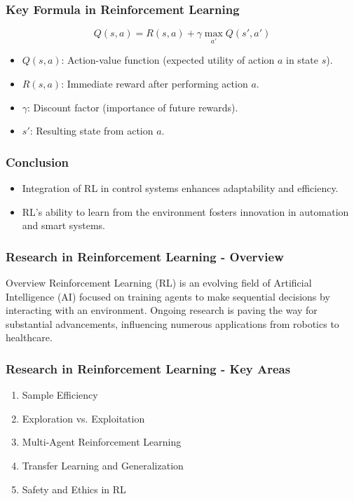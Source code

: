 \documentclass[aspectratio=169]{beamer}
\begin{document}
\begin{frame}[fragile]
    \frametitle{Key Formula in Reinforcement Learning}
    \begin{equation}
        Q(s, a) = R(s, a) + \gamma \max_{a'} Q(s', a')
    \end{equation}
    \begin{itemize}
        \item \( Q(s, a) \): Action-value function (expected utility of action \( a \) in state \( s \)).
        \item \( R(s, a) \): Immediate reward after performing action \( a \).
        \item \( \gamma \): Discount factor (importance of future rewards).
        \item \( s' \): Resulting state from action \( a \).
    \end{itemize}
\end{frame}

\begin{frame}[fragile]
    \frametitle{Conclusion}
    \begin{itemize}
        \item Integration of RL in control systems enhances adaptability and efficiency.
        \item RL's ability to learn from the environment fosters innovation in automation and smart systems.
    \end{itemize}
\end{frame}

\begin{frame}[fragile]
    \frametitle{Research in Reinforcement Learning - Overview}
    \begin{block}{Overview}
        Reinforcement Learning (RL) is an evolving field of Artificial Intelligence (AI) focused on training agents to make sequential decisions by interacting with an environment. Ongoing research is paving the way for substantial advancements, influencing numerous applications from robotics to healthcare.
    \end{block}
\end{frame}

\begin{frame}[fragile]
    \frametitle{Research in Reinforcement Learning - Key Areas}
    \begin{enumerate}
        \item Sample Efficiency
        \item Exploration vs. Exploitation
        \item Multi-Agent Reinforcement Learning
        \item Transfer Learning and Generalization
        \item Safety and Ethics in RL
    \end{enumerate}
\end{frame}
\end{document}
